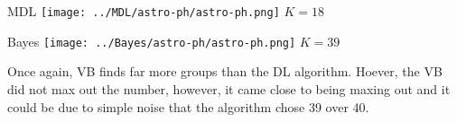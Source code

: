 \begin{minipage}{0.45\linewidth}
MDL
\centering
\texttt{[image: ../MDL/astro-ph/astro-ph.png]}
$K=18$

\end{minipage}
\begin{minipage}{0.45\linewidth}
Bayes
\centering
\texttt{[image: ../Bayes/astro-ph/astro-ph.png]}
$K=39$
\end{minipage}
\vspace{10pt}

Once again, VB finds far more groups than the DL algorithm. Hoever, the VB
did not max out the number, however, it came close to being maxing out and
it could be due to simple noise that the algorithm chose 39 over 40.
